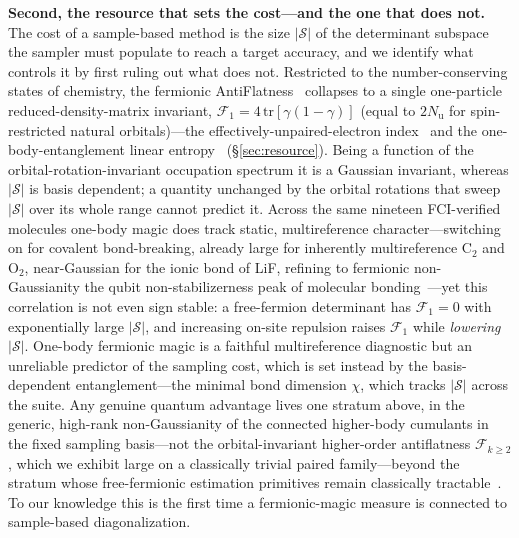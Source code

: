 \textbf{Second, the resource that sets the cost---and the one that does not.} The cost of a
sample-based method is the size $|\mathcal S|$ of the determinant subspace the sampler must populate to
reach a target accuracy, and we identify what controls it by first ruling out what does not. Restricted
to the number-conserving states of chemistry, the fermionic AntiFlatness~\cite{sierant2026} collapses
to a single one-particle reduced-density-matrix invariant,
$\mathcal F_1=4\,\mathrm{tr}[\gamma(1-\gamma)]$ (equal to $2N_{\mathrm u}$ for spin-restricted natural
orbitals)---the effectively-unpaired-electron
index~\cite{takatsuka1978,staroverov2000} and the one-body-entanglement linear
entropy~\cite{gigena2020} (\S\ref{sec:resource}). Being a function of the orbital-rotation-invariant
occupation spectrum it is a Gaussian invariant, whereas $|\mathcal S|$ is basis dependent; a quantity
unchanged by the orbital rotations that sweep $|\mathcal S|$ over its whole range cannot predict it.
Across the same nineteen FCI-verified molecules one-body magic does track static, multireference
character---switching on for covalent bond-breaking, already large for inherently multireference
$\mathrm{C_2}$ and $\mathrm{O_2}$, near-Gaussian for the ionic bond of LiF, refining to fermionic
non-Gaussianity the qubit non-stabilizerness peak of molecular bonding~\cite{sarkis2025}---yet this
correlation is not even sign stable: a free-fermion determinant has $\mathcal F_1=0$ with exponentially
large $|\mathcal S|$, and increasing on-site repulsion raises $\mathcal F_1$ while \emph{lowering}
$|\mathcal S|$. One-body fermionic magic is a faithful multireference diagnostic but an unreliable
predictor of the sampling cost, which is set instead by the basis-dependent entanglement---the minimal
bond dimension $\chi$, which tracks $|\mathcal S|$ across the suite. Any genuine quantum advantage lives
one stratum above, in the generic, high-rank non-Gaussianity of the connected higher-body cumulants in
the fixed sampling basis---not the orbital-invariant higher-order antiflatness $\mathcal F_{k\ge2}$, which
we exhibit large on a classically trivial paired family---beyond the stratum whose free-fermionic
estimation primitives remain classically tractable~\cite{oh2026}.
To our knowledge this is the first time a fermionic-magic measure is connected to sample-based
diagonalization.

